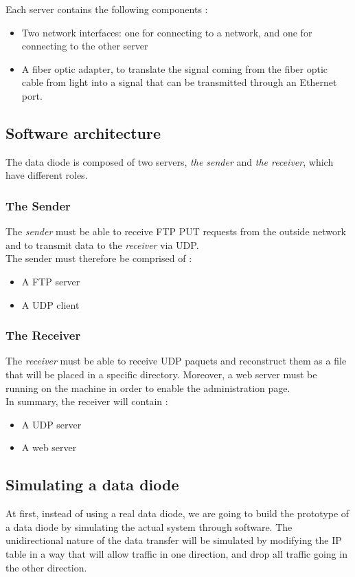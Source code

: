 \documentclass[a4paper,11pt]{article}
\begin{document}
Each server contains the following components :
\begin{itemize}
\item{Two network interfaces: one for connecting to a network, and one for connecting to the other server}
\item{A fiber optic adapter, to translate the signal coming from the fiber optic cable from light into a signal that can be transmitted through an Ethernet port.}
\end{itemize}

\subsection{Software architecture}
The data diode is composed of two servers, \textit{the sender} and \textit{the receiver}, which have different roles. 

\subsubsection{The Sender}
The \textit{sender} must be able to receive FTP PUT requests from the outside network and to transmit data to the \textit{receiver} via UDP.\\

The sender must therefore be comprised of :
\begin{itemize}
\item{A FTP server}
\item{A UDP client}
\end{itemize} 

\subsubsection{The Receiver}
The \textit{receiver} must be able to receive UDP paquets and reconstruct them as a file that will be placed in a specific directory. Moreover, a web server must be running on the machine in order to enable the administration page.\\

In summary, the receiver will contain :
\begin{itemize}
\item{A UDP server}
\item{A web server}
\end{itemize}

\subsection{Simulating a data diode}
At first, instead of using a real data diode, we are going to build the prototype of a data diode by simulating the actual system through software. The unidirectional nature of the data transfer will be simulated by modifying the IP table in a way that will allow traffic in one direction, and drop all traffic going in the other direction.
\end{document}

